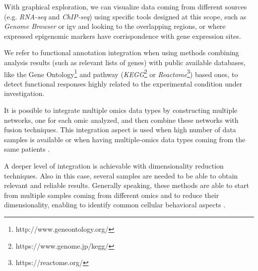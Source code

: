 With graphical exploration, we can visualize data coming from different sources (e.g. \textit{RNA-seq} and \textit{ChIP-seq}) using specific tools designed at this scope, such as \textit{Genome Browser} \cite{Karolchik2011} or \gls{igv} \cite{Robinson2011, Thorvaldsdottir2013} and looking to the overlapping regions, or where expressed epigenomic markers have corrispondence with gene expression sites.

We refer to functional annotation integration when using methods combining analysis results (such as relevant lists of genes) with public available databases,  like the Gene Ontology\footnote{http://www.geneontology.org/} and pathway (\textit{KEGG}\footnote{https://www.genome.jp/kegg/} or \textit{Reactome}\footnote{https://reactome.org/}) based ones, to detect functional responses highly related to the experimental condition under investigation.

It is possible to integrate multiple omics data types by constructing multiple networks, one for each omic analyzed, and then combine these networks with fusion techniques.
This integration aspect is used when high number of data samples is available or when having multiple-omics data types coming from the same patients \cite{Wang2014}.

A deeper level of integration is achievable with dimensionality reduction techniques. 
Also in this case, several samples are needed to be able to obtain relevant and reliable results.
Generally speaking, these methods are able to start from multiple samples coming from different omics and to reduce their dimensionality, enabling to identify common cellular behavioral aspects \cite{Rohart2017,Argelaguet2018}.



